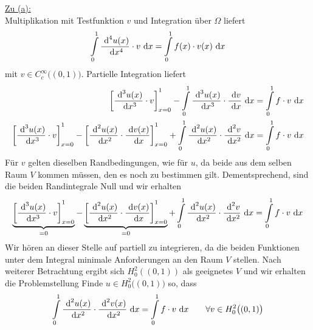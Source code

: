 \documentclass[12pt,a4paper]{article}
\begin{document}
\begin{lösung}
\underline{Zu (a):}\\
Multiplikation mit Testfunktion $v$ und Integration über $\Omega$ liefert
\begin{align*}
\int\limits_0^1 \frac{\text{ d}^4 u(x)}{\text{ d} x^4}\cdot v\text{ d} x=\int\limits_0^1 f(x)\cdot v(x)\text{ d} x
\end{align*}
mit $v\in C_c^\infty\big((0,1)\big)$. Partielle Integration liefert
\begin{align*}
\left[\frac{\text{ d}^3 u(x)}{\text{ d} x^3}\cdot v\right]_{x=0}^1
-\int\limits_0^1 \frac{\text{ d}^3 u(x)}{\text{ d} x^3}\cdot\frac{\text{ d} v}{\text{ d} x}\text{ d} x=\int\limits_0^1 f\cdot v\text{ d} x\\
\left[\frac{\text{ d}^3 u(x)}{\text{ d} x^3}\cdot v\right]_{x=0}^1 -
\left[\frac{\text{ d}^2 u(x)}{\text{ d} x^2}\cdot \frac{\text{ d} v(x)}{\text{ d} x}\right]_{x=0}^1
+\int\limits_0^1 \frac{\text{ d}^2 u(x)}{\text{ d} x^2}\cdot\frac{\text{ d}^2 v}{\text{ d} x^2}\text{ d} x=\int\limits_0^1 f\cdot v\text{ d} x\\
\end{align*}
Für $v$ gelten dieselben Randbedingungen, wie für $u$, da beide aus dem selben Raum $V$ kommen müssen, den es noch zu bestimmen gilt. Dementsprechend, sind die beiden Randintegrale Null und wir erhalten
\begin{align*}
	\underbrace{\left[\frac{\text{ d}^3 u(x)}{\text{ d} x^3}\cdot v\right]_{x=0}^1}_{=0} -
\underbrace{\left[\frac{\text{ d}^2 u(x)}{\text{ d} x^2}\cdot \frac{\text{ d} v(x)}{\text{ d} x}\right]_{x=0}^1}_{=0}
+\int\limits_0^1 \frac{\text{ d}^2 u(x)}{\text{ d} x^2}\cdot\frac{\text{ d}^2 v}{\text{ d} x^2}\text{ d} x=\int\limits_0^1 f\cdot v\text{ d} x\\
\end{align*}
Wir hören an dieser Stelle auf partiell zu integrieren, da die beiden Funktionen unter dem Integral minimale Anforderungen an den Raum $V$ stellen. Nach weiterer Betrachtung ergibt sich $H^2_0((0,1))$ als geeignetes $V$ und wir erhalten die Problemstellung \enter
Finde $u\in H^2_0\big((0,1)\big)$ so, dass
\begin{align*}
\int\limits_0^1 \frac{\text{ d}^2 u(x)}{\text{ d} x^2}\cdot\frac{\text{ d}^2 v(x)}{\text{ d} x^2}\text{ d} x=\int\limits_0^1 f\cdot v\text{ d} x\qquad\forall v\in H_0^2\big((0,1)\big)
\end{align*}


\end{lösung}
\end{document}
